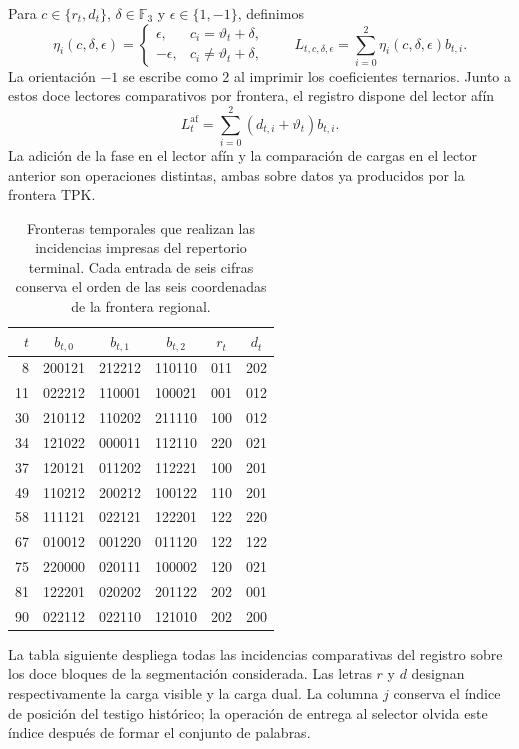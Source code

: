 Para $c\in\{r_t,d_t\}$, $\delta\in\mathbb F_3$ y
$\epsilon\in\{1,-1\}$, definimos
\[
 \eta_i(c,\delta,\epsilon)=
 \begin{cases}
  \epsilon,&c_i=\vartheta_t+\delta,\\
  -\epsilon,&c_i\ne\vartheta_t+\delta,
 \end{cases}
 \qquad
 L_{t,c,\delta,\epsilon}
   =\sum_{i=0}^{2}\eta_i(c,\delta,\epsilon)b_{t,i}.
\]
La orientación $-1$ se escribe como $2$ al imprimir los coeficientes
ternarios. Junto a estos doce lectores comparativos por frontera, el
registro dispone del lector afín
\[
 L^{\mathrm{af}}_t
    =\sum_{i=0}^{2}(d_{t,i}+\vartheta_t)b_{t,i}.
\]
La adición de la fase en el lector afín y la comparación de cargas en
el lector anterior son operaciones distintas, ambas sobre datos ya
producidos por la frontera TPK.

\begin{table}[htbp]
\centering\small
\begin{tabular}{rccc cc}
\toprule
$t$&$b_{t,0}$&$b_{t,1}$&$b_{t,2}$&$r_t$&$d_t$\\
\midrule
8 &200121&212212&110110&011&202\\
11&022212&110001&100021&001&012\\
30&210112&110202&211110&100&012\\
34&121022&000011&112110&220&021\\
37&120121&011202&112221&100&201\\
49&110212&200212&100122&110&201\\
58&111121&022121&122201&122&220\\
67&010012&001220&011120&122&122\\
75&220000&020111&100002&120&021\\
81&122201&020202&201122&202&001\\
90&022112&022110&121010&202&200\\
\bottomrule
\end{tabular}
\caption{Fronteras temporales que realizan las incidencias impresas del
repertorio terminal. Cada entrada de seis cifras conserva el orden de
las seis coordenadas de la frontera regional.}
\label{tab:terminal-bandas-testigo}
\end{table}

La tabla siguiente despliega todas las incidencias comparativas del
registro sobre los doce bloques de la segmentación considerada. Las
letras $r$ y $d$ designan respectivamente la carga visible y la carga
dual. La columna $j$ conserva el índice de posición del testigo histórico;
la operación de entrega al selector olvida este índice después de formar
el conjunto de palabras.

